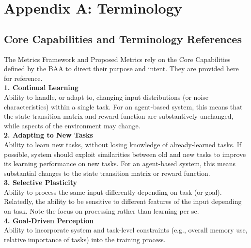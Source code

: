 \chapter{Appendix A: Terminology}\label{ch:appendix_a}
\section*{Core Capabilities and Terminology References}
\label{sec:core_capabilities}

The Metrics Framework and Proposed Metrics rely on the Core Capabilities defined by the BAA to direct their purpose and intent. They are provided here for reference.\\[0.2in]%

\textbf{1. Continual Learning}\\

Ability to handle, or adapt to, changing input distributions (or noise characteristics) within a single task. For an agent-based system, this means that the state transition matrix and reward function are substantively unchanged, while aspects of the environment may change.\\[0.1in]

\textbf{2. Adapting to New Tasks}\\

Ability to learn new tasks, without losing knowledge of already-learned tasks. If possible, system should exploit similarities between old and new tasks to improve its learning performance on new tasks. For an agent-based system, this means substantial changes to the state transition matrix or reward function.\\[0.1in]

\textbf{3. Selective Plasticity}\\

Ability to process the same input differently depending on task (or goal). Relatedly, the ability to be sensitive to different features of the input depending on task. Note the focus on processing rather than learning per se.\\[0.1in]

\textbf{4. Goal-Driven Perception}\\

Ability to incorporate system and task-level constraints (e.g., overall memory use, relative importance of tasks) into the training process.\\[0.1in]

